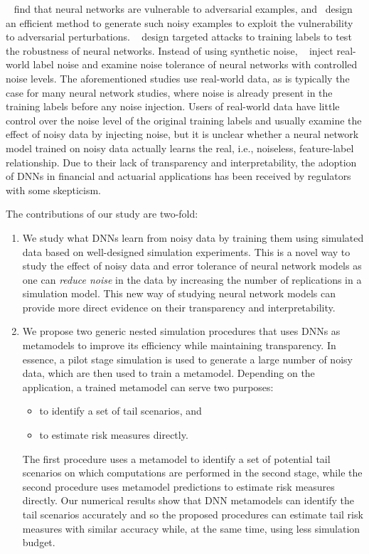 ~\cite{szegedy2013intriguing} find that neural networks are vulnerable to adversarial examples, and~\cite{goodfellow2014explaining} design an efficient method to generate such noisy examples to exploit the vulnerability to adversarial perturbations.
~\cite{carlini2017towards} design targeted attacks to training labels to test the robustness of neural networks. 
Instead of using synthetic noise, ~\cite{jiang2020beyond} inject real-world label noise and examine noise tolerance of neural networks with controlled noise levels.
The aforementioned studies use real-world data, as is typically the case for many neural network studies, where noise is already present in the training labels before any noise injection.
Users of real-world data have little control over the noise level of the original training labels and usually examine the effect of noisy data by injecting noise, but it is unclear whether a neural network model trained on noisy data actually learns the real, i.e., noiseless, feature-label relationship.
Due to their lack of transparency and interpretability, the adoption of DNNs in financial and actuarial applications has been received by regulators with some skepticism.

The contributions of our study are two-fold:
\begin{enumerate}
    \item We study what DNNs learn from noisy data by training them using simulated data based on well-designed simulation experiments.
    This is a novel way to study the effect of noisy data and error tolerance of neural network models as one can \textit{reduce noise} in the data by increasing the number of replications in a simulation model.
    This new way of studying neural network models can provide more direct evidence on their transparency and interpretability.  
    \item We propose two generic nested simulation procedures that uses DNNs as metamodels to improve its efficiency while maintaining transparency. 
    In essence, a pilot stage simulation is used to generate a large number of noisy data, which are then used to train a metamodel.
    Depending on the application, a trained metamodel can serve two purposes: 
    \begin{itemize}
        \item to identify a set of tail scenarios, and 
        \item to estimate risk measures directly.
    \end{itemize}
    The first procedure uses a metamodel to identify a set of potential tail scenarios on which computations are performed in the second stage, while the second procedure uses metamodel predictions to estimate risk measures directly.
    Our numerical results show that DNN metamodels can identify the tail scenarios accurately and so the proposed procedures can estimate tail risk measures with similar accuracy while, at the same time, using less simulation budget.
\end{enumerate}

